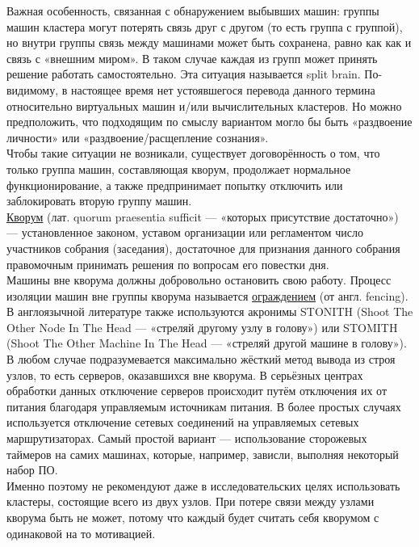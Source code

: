 \documentclass[14pt, a4paper]{article}
\begin{document}
Важная особенность, связанная с обнаружением выбывших машин: группы машин кластера могут
потерять связь друг с другом (то есть группа с группой), но внутри группы связь между машинами
может быть сохранена, равно как как и связь с «внешним миром». В таком случае каждая из групп
может принять решение работать самостоятельно. Эта ситуация называется split brain. По-видимому,
в настоящее время нет устоявшегося перевода данного термина относительно виртуальных машин
и/или вычислительных кластеров. Но можно предположить, что подходящим по смыслу вариантом
могло бы быть «раздвоение личности» или «раздвоение/расщепление сознания».\\

Чтобы такие ситуации не возникали, существует договорённость о том, что только группа машин,
составляющая кворум, продолжает нормальное функционирование, а также предпринимает попытку
отключить или заблокировать вторую группу машин.\\

\href{https://ru.wikipedia.org/wiki/Кворум}{Кворум} (лат. quorum praesentia sufficit — «которых присутствие достаточно») — установленное
законом, уставом организации или регламентом число участников собрания (заседания), достаточное
для признания данного собрания правомочным принимать решения по вопросам его повестки дня.\\

Машины вне кворума должны добровольно остановить свою работу. Процесс изоляции машин вне
группы кворума называется \href{https://en.wikipedia.org/wiki/Fencing_(computing).}{ограждением} (от англ. fencing). В англоязычной литературе также
используются акронимы STONITH (Shoot The Other Node In The Head — «стреляй другому узлу в
голову») или STOMITH (Shoot The Other Machine In The Head — «стреляй другой машине в голову»). В
любом случае подразумевается максимально жёсткий метод вывода из строя узлов, то есть серверов,
оказавшихся вне кворума. В серьёзных центрах обработки данных отключение серверов происходит
путём отключения их от питания благодаря управляемым источникам питания. В более простых
случаях используется отключение сетевых соединений на управляемых сетевых маршрутизаторах.
Самый простой вариант — использование сторожевых таймеров на самих машинах, которые,
например, зависли, выполняя некоторый набор ПО.\\

Именно поэтому не рекомендуют даже в исследовательских целях использовать кластеры, состоящие
всего из двух узлов. При потере связи между узлами кворума быть не может, потому что каждый будет
считать себя кворумом с одинаковой на то мотивацией.\\
\end{document}
